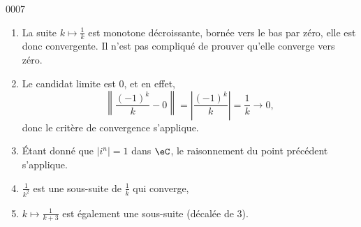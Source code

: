 
\begin{corrige}{0007}

\begin{enumerate}
\item La suite $k\mapsto \frac{1}{ k }$ est monotone décroissante, bornée vers le bas par zéro, elle est donc convergente. Il n'est pas compliqué de prouver qu'elle converge vers zéro.
\item Le candidat limite est $0$, et en effet,
\begin{equation}
	\left\|  \frac{ (-1)^k }{ k }-0 \right\|=\left| \frac{ (-1)^k }{ k }\right|=\frac{1}{ k } \to 0,
\end{equation}
donc le critère de convergence s'applique.
\item Étant donné que $| i^n |=1$ dans $\eC$, le raisonnement du point précédent s'applique.
\item $\frac{1}{ k^2 }$ est une sous-suite de $\frac{1}{ k }$ qui converge,
\item $k\mapsto\frac{1}{ k+3 }$ est également une sous-suite (décalée de $3$).
\end{enumerate}


\end{corrige}
